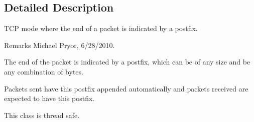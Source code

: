 \subsection{Detailed Description}
TCP mode where the end of a packet is indicated by a postfix. \begin{DoxyRemark}{Remarks}
Michael Pryor, 6/28/2010.
\end{DoxyRemark}
The end of the packet is indicated by a postfix, which can be of any size and be any combination of bytes. \par
 Packets sent have this postfix appended automatically and packets received are expected to have this postfix. \par
\par


This class is thread safe. 

